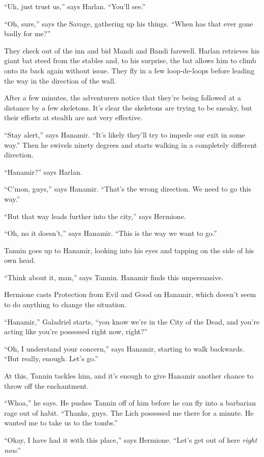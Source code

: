 \documentclass[smalldemyvopaper,11pt,twoside,onecolumn,openright,extrafontsizes]{memoir}
\begin{document}
``Uh, just trust us,'' says Harlan. ``You'll see.''

``Oh, sure,'' says the Savage, gathering up his things. ``When has that
ever gone badly for me?''

They check out of the inn and bid Mandi and Bandi farewell. Harlan
retrieves his giant bat steed from the stables and, to his surprise, the
bat allows him to climb onto its back again without issue. They fly in a
few loop-de-loops before leading the way in the direction of the wall.

After a few minutes, the adventurers notice that they're being followed
at a distance by a few skeletons. It's clear the skeletons are trying to
be sneaky, but their efforts at stealth are not very effective.

``Stay alert,'' says Hanamir. ``It's likely they'll try to impede our
exit in some way.'' Then he swivels ninety degrees and starts walking in
a completely different direction.

``Hanamir?'' says Harlan.

``C'mon, guys,'' says Hanamir. ``That's the wrong direction. We need to
go this way.''

``But that way leads further into the city,'' says Hermione.

``Oh, no it doesn't,'' says Hanamir. ``This is the way we want to go.''

Tannin goes up to Hanamir, looking into his eyes and tapping on the side
of his own head.

``Think about it, man,'' says Tannin. Hanamir finds this unpersuasive.

Hermione casts Protection from Evil and Good on Hanamir, which doesn't
seem to do anything to change the situation.

``Hanamir,'' Galadriel starts, ``you know we're in the City of the Dead,
and you're acting like you're possessed right now, right?''

``Oh, I understand your concern,'' says Hanamir, starting to walk
backwards. ``But really, enough. Let's go.''

At this, Tannin tackles him, and it's enough to give Hanamir another
chance to throw off the enchantment.

``Whoa,'' he says. He pushes Tannin off of him before he can fly into a
barbarian rage out of habit. ``Thanks, guys. The Lich possessed me there
for a minute. He wanted me to take us to the tombs.''

``Okay, I have had it with this place,'' says Hermione. ``Let's get out
of here \emph{right now}.''
\end{document}
